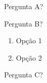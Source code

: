 \label{ap:B}

\begin{questao}
	\item Pergunta A?
	\item Pergunta B?
		\begin{enumerate}
			\item Opção 1
			\item Opção 2
		\end{enumerate}
	\item Pergunta C?
\end{questao}
